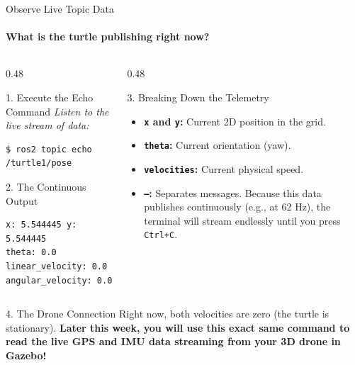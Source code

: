 \begin{frame}[fragile]{Observe Live Topic Data}
\framesubtitle{What is the turtle publishing right now?}

\footnotesize

\begin{columns}[T,onlytextwidth]

    \begin{column}{0.48\textwidth}
        \begin{block}{1. Execute the Echo Command}
            \textit{Listen to the live stream of data:}
\begin{verbatim}
$ ros2 topic echo /turtle1/pose
\end{verbatim}
        \end{block}

        \begin{exampleblock}{2. The Continuous Output}
\begin{verbatim}
x: 5.544445 y: 5.544445
theta: 0.0  linear_velocity: 0.0
angular_velocity: 0.0
\end{verbatim}
        \end{exampleblock}
    \end{column}

    \begin{column}{0.48\textwidth}
        \begin{block}{3. Breaking Down the Telemetry}
            \begin{itemize}
                \setlength{\itemsep}{0.25em}
                \item \textbf{\texttt{x} and \texttt{y}:} Current 2D position in the grid.
                \item \textbf{\texttt{theta}:} Current orientation (yaw).
                \item \textbf{\texttt{velocities}:} Current physical speed.
                \item \textbf{\texttt{---}:} Separates messages. Because this data publishes continuously (e.g., at 62 Hz), the terminal will stream endlessly until you press \texttt{Ctrl+C}.
            \end{itemize}
        \end{block}
    \end{column}

\end{columns}

        \begin{alertblock}{4. The Drone Connection}
            Right now, both velocities are zero (the turtle is stationary). \textbf{Later this week, you will use this exact same command to read the live GPS and IMU data streaming from your 3D drone in Gazebo!}
        \end{alertblock}
\end{frame}

